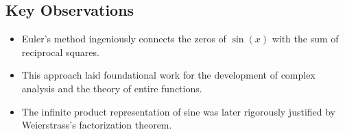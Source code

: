 \subsection{Key Observations}

\begin{itemize}

    \item Euler's method ingeniously connects the zeros of \( \sin(x) \) with the sum of reciprocal squares.

    \item This approach laid foundational work for the development of complex analysis and the theory 
          of entire functions.

    \item The infinite product representation of sine was later rigorously justified by Weierstrass's 
          factorization theorem.

\end{itemize}
